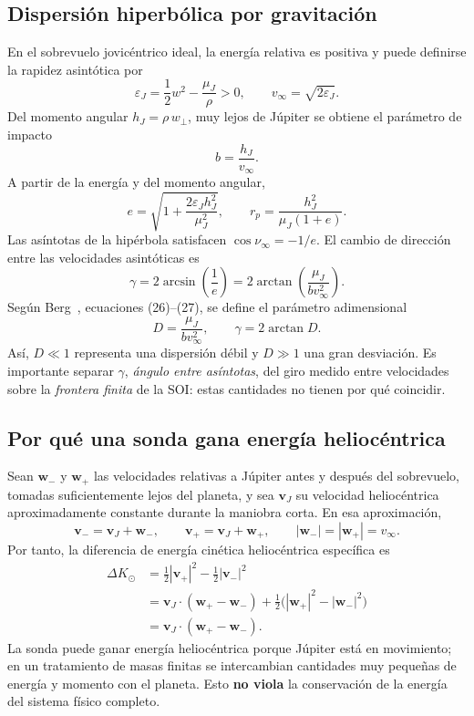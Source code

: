 \documentclass[11pt,a4paper]{article}
\newcommand{\vect}[1]{\bm{#1}}
\newcommand{\muJ}{\mu_{J}}
\newcommand{\vJ}{\vect v_{J}}
\begin{document}
\subsection{Dispersión hiperbólica por gravitación}
En el sobrevuelo jovicéntrico ideal, la energía relativa es positiva y puede definirse la rapidez asintótica por
\begin{equation}
\varepsilon_J=\frac12w^2-\frac{\muJ}{\rho}>0,
\qquad v_\infty=\sqrt{2\varepsilon_J}.
\end{equation}
Del momento angular $h_J=\rho\,w_\perp$, muy lejos de Júpiter se obtiene el parámetro de impacto
\begin{equation}\label{eq:b}
b=\frac{h_J}{v_\infty}.
\end{equation}
A partir de la energía y del momento angular,
\begin{equation}\label{eq:ecc}
e=\sqrt{1+\frac{2\varepsilon_J h_J^2}{\muJ^2}},\qquad
r_p=\frac{h_J^2}{\muJ(1+e)}.
\end{equation}
Las asíntotas de la hipérbola satisfacen $\cos\nu_\infty=-1/e$. El cambio de dirección entre las velocidades asintóticas es
\begin{equation}\label{eq:gamma}
\gamma=2\arcsin\left(\frac1e\right)=2\arctan\left(\frac{\muJ}{bv_\infty^2}\right).
\end{equation}
Según Berg~\cite{berg2023}, ecuaciones (26)--(27), se define el parámetro adimensional
\begin{equation}\label{eq:D}
D=\frac{\muJ}{b v_\infty^2},\qquad \gamma=2\arctan D.
\end{equation}
Así, $D\ll1$ representa una dispersión débil y $D\gg1$ una gran desviación. Es importante separar $\gamma$, \emph{ángulo entre asíntotas}, del giro medido entre velocidades sobre la \emph{frontera finita} de la SOI: estas cantidades no tienen por qué coincidir.

\subsection{Por qué una sonda gana energía heliocéntrica}
Sean $\vect w_-$ y $\vect w_+$ las velocidades relativas a Júpiter antes y después del sobrevuelo, tomadas suficientemente lejos del planeta, y sea $\vJ$ su velocidad heliocéntrica aproximadamente constante durante la maniobra corta. En esa aproximación,
\begin{equation}
\vect v_-=\vJ+\vect w_-,\qquad
\vect v_+=\vJ+\vect w_+,\qquad |\vect w_-|=|\vect w_+|=v_\infty.
\end{equation}
Por tanto, la diferencia de energía cinética heliocéntrica específica es
\begin{align}\label{eq:transfer}
\Delta K_\odot
&=\frac12|\vect v_+|^2-\frac12|\vect v_-|^2\\
&=\vJ\cdot(\vect w_+-\vect w_-)
+\frac12\bigl(|\vect w_+|^2-|\vect w_-|^2\bigr)\\
&=\boxed{\vJ\cdot(\vect w_+-\vect w_-)}.
\end{align}
La sonda puede ganar energía heliocéntrica porque Júpiter está en movimiento; en un tratamiento de masas finitas se intercambian cantidades muy pequeñas de energía y momento con el planeta. Esto \textbf{no viola} la conservación de la energía del sistema físico completo.
\end{document}
